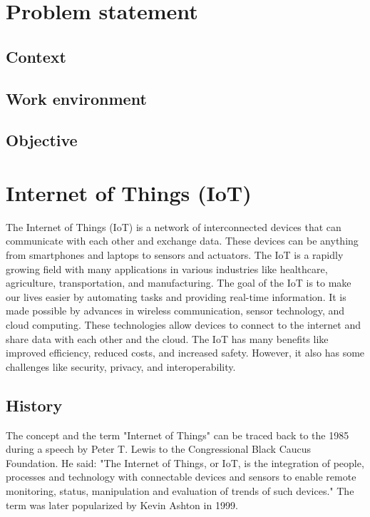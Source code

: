 \chapter{Problem statement}
\label{chap:problem-statement}

\section{Context}
\label{sec:context}



\section{Work environment}
\label{sec:work-environment}

\section{Objective}
\label{sec:objective}

\chapter{Internet of Things (IoT)}
\label{chap:iot}

The Internet of Things (IoT) is a network of interconnected devices that can communicate with each other and exchange
data. These devices can be anything from smartphones and laptops to sensors and actuators. The IoT is a rapidly growing
field with many applications in various industries like healthcare, agriculture, transportation, and manufacturing. The
goal of the IoT is to make our lives easier by automating tasks and providing real-time information. It is made
possible by advances in wireless communication, sensor technology, and cloud computing. These technologies allow devices
to connect to the internet and share data with each other and the cloud. The IoT has many benefits like improved
efficiency, reduced costs, and increased safety. However, it also has some challenges like security, privacy, and
interoperability.

\section{History}
\label{sec:iot-history}

The concept and the term "Internet of Things" can be traced back to the 1985 during a speech by Peter T. Lewis to the
Congressional Black Caucus Foundation.\cite{chetansharma-2016} He said: "The Internet of Things, or IoT, is the
integration of people, processes and technology with connectable devices and sensors to enable remote monitoring,
status, manipulation and evaluation of trends of such devices." The term was later popularized by Kevin Ashton in
1999.\cite{ashton-2009}

